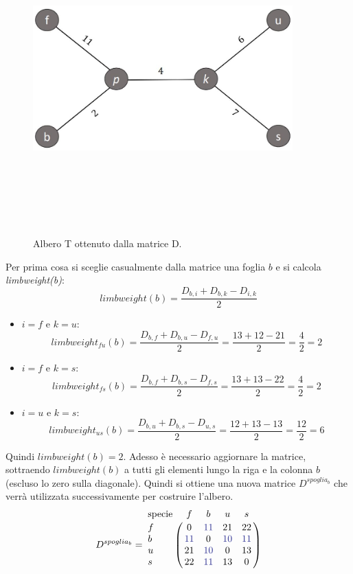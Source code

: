 \begin{figure}[h!]
\centering
	\includegraphics[height=12cm, width=10cm, keepaspectratio]{additive_tree_1.jpg}
 	\caption{Albero T ottenuto dalla matrice D.}
  	\label{fig:additivePhylogeny_1}
\end{figure}
\newline
Per prima cosa si sceglie casualmente dalla matrice una foglia $b$ e si calcola \textit{limbweight(b)}:
\[limbweight(b)=\frac{D_{b,i}+D_{b,k}-D_{i,k}}{2}\]
\begin{itemize}
	\item $i=f$ e $k=u$:
	\[limbweight_{fu}(b)=\frac{D_{b,f}+D_{b,u}-D_{f,u}}{2}=\frac{13+12-21}{2}=\frac{4}{2}=2\]
	\item $i=f$ e $k=s$:
	\[limbweight_{fs}(b)=\frac{D_{b,f}+D_{b,s}-D_{f,s}}{2}=\frac{13+13-22}{2}=\frac{4}{2}=2\]
	\item $i=u$ e $k=s$:
	\[limbweight_{us}(b)=\frac{D_{b,u}+D_{b,s}-D_{u,s}}{2}=\frac{12+13-13}{2}=\frac{12}{2}=6\]
\end{itemize}
Quindi $limbweight(b)=2$.
\newline
Adesso è necessario aggiornare la matrice, sottraendo $limbweight(b)$ a tutti gli elementi lungo la riga e la colonna $b$ (escluso lo zero sulla diagonale). Quindi si ottiene una nuova matrice $D^{spoglia_{b}}$ che verrà utilizzata successivamente per costruire l'albero.
\[
D^{spoglia_{b}}= \bordermatrix{\text{specie}&f&b&u&s\cr
                f& 0 & {\color{Blue} 11} & 21 & 22\cr
                b& {\color{Blue} 11} & 0 & {\color{Blue} 10} & {\color{Blue} 11}\cr
                u& 21 & {\color{Blue} 10} & 0 & 13\cr
                s& 22 & {\color{Blue} 11} & 13 & 0}
\]
